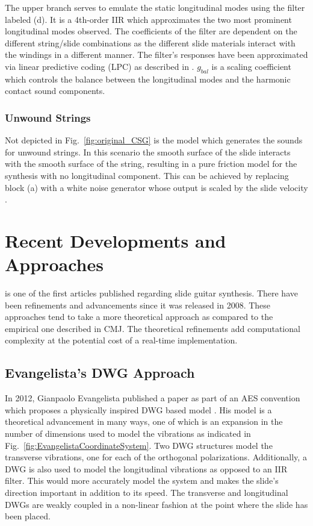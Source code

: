 \documentclass[main.tex]{subfiles}
\begin{document}
The upper branch serves to emulate the static longitudinal modes using the filter labeled (d). It is a 4th-order IIR which approximates the two most prominent longitudinal modes observed. The coefficients of the filter are dependent on the different string/slide combinations as the different slide materials interact with the windings in a different manner. The filter's responses have been approximated via linear predictive coding (LPC) as described in . $g_{bal}$ is a scaling coefficient which controls the balance between the longitudinal modes and the harmonic contact sound components.

\subsubsection{Unwound Strings}
Not depicted in Fig.~\ref{fig:original_CSG} is the model which generates the sounds for unwound strings. In this scenario the smooth surface of the slide interacts with the smooth surface of the string, resulting in a pure friction model for the synthesis with no longitudinal component. This can be achieved by replacing block (a) with a white noise generator whose output is scaled by the slide velocity .

\section{Recent Developments and Approaches}
 is one of the first articles published regarding slide guitar synthesis. There have been refinements and advancements since it was released in 2008. These approaches tend to take a more theoretical approach as compared to the empirical one described in CMJ. The theoretical refinements add computational complexity at the potential cost of a real-time implementation.

\subsection{Evangelista's DWG Approach}
In 2012, Gianpaolo Evangelista published a paper as part of an AES convention which proposes a physically inspired DWG based model . His model is a theoretical advancement in many ways, one of which is an expansion in the number of dimensions used to model the vibrations as indicated in Fig.~\ref{fig:EvangelistaCoordinateSystem}. Two DWG structures model the transverse vibrations, one for each of the orthogonal polarizations. Additionally, a DWG is also used to model the longitudinal vibrations as opposed to an IIR filter. This would more accurately model the system and makes the slide's direction important in addition to its speed. The transverse and longitudinal DWGs are weakly coupled in a non-linear fashion at the point where the slide has been placed.
\end{document}
